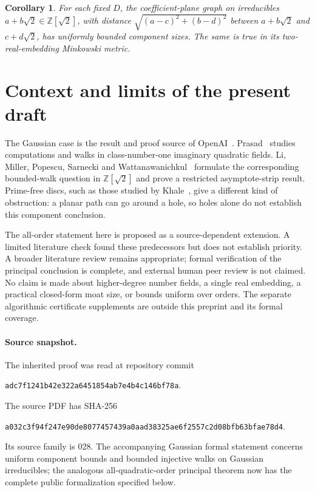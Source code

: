 \documentclass[11pt]{article}
\numberwithin{equation}{section}
\newtheorem{corollary}[theorem]{Corollary}
\theoremstyle{definition}\newtheorem{definition}[theorem]{Definition}
\theoremstyle{remark}\newtheorem{remark}[theorem]{Remark}
\newcommand{\Z}{\mathbb Z}\newcommand{\Q}{\mathbb Q}\newcommand{\R}{\mathbb R}
\begin{document}
\begin{corollary}
For each fixed $D$, the coefficient-plane graph on irreducibles $a+b\sqrt2\in\Z[\sqrt2]$, with distance
$\sqrt{(a-c)^2+(b-d)^2}$ between $a+b\sqrt2$ and $c+d\sqrt2$, has uniformly bounded component sizes. The same is true in its two-real-embedding Minkowski metric.
\end{corollary}

\section{Context and limits of the present draft}

The Gaussian case is the result and proof source of OpenAI~\cite{openai}. Prasad~\cite{prasad} studies computations and walks in class-number-one imaginary quadratic fields. Li, Miller, Popescu, Sarnecki and Wattanawanichkul~\cite{li} formulate the corresponding bounded-walk question in $\Z[\sqrt2]$ and prove a restricted asymptote-strip result. Prime-free discs, such as those studied by Khale~\cite{khale}, give a different kind of obstruction: a planar path can go around a hole, so holes alone do not establish this component conclusion.

The all-order statement here is proposed as a source-dependent extension. A limited literature check found these predecessors but does not establish priority. A broader literature review remains appropriate; formal verification of the principal conclusion is complete, and external human peer review is not claimed. No claim is made about higher-degree number fields, a single real embedding, a practical closed-form moat size, or bounds uniform over orders. The separate algorithmic certificate supplements are outside this preprint and its formal coverage.

\paragraph{Source snapshot.}
The inherited proof was read at repository commit
\begin{center}\small\texttt{adc7f1241b42e322a6451854ab7e4b4c146bf78a}.\end{center}
The source PDF has SHA-256
\begin{center}\small\texttt{a032c3f94f247e90de8077457439a0aad38325ae6f2557c2d08bfb63bfae78d4}.\end{center}
Its source family is 028. The accompanying Gaussian formal statement concerns uniform component bounds and bounded injective walks on Gaussian irreducibles; the analogous all-quadratic-order principal theorem now has the complete public formalization specified below.
\end{document}
